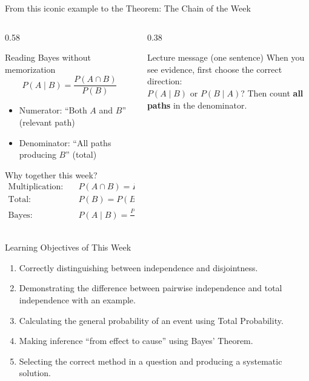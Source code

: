 \documentclass[light]{lutbeamer}
\begin{document}
\begin{frame}{From this iconic example to the Theorem: The Chain of the Week}
    \footnotesize
    \begin{columns}[T]
        \begin{column}{0.58\textwidth}
            \begin{block}{Reading Bayes without memorization}
                \[
                P(A\mid B)=\frac{P(A\cap B)}{P(B)}
                \]
                \begin{itemize}
                    \item Numerator: ``Both $A$ and $B$'' (relevant path)
                    \item Denominator: ``All paths producing $B$'' (total)
                \end{itemize}
            \end{block}

            \begin{block}{Why together this week?}
                \[
                \begin{aligned}
                    \text{Multiplication:}\quad & P(A\cap B)=P(A)P(B\mid A) \\
                    \text{Total:}\quad & P(B)=P(B\mid A)P(A)+P(B\mid A')P(A') \\
                    \text{Bayes:}\quad & P(A\mid B)=\frac{P(A\cap B)}{P(B)}
                \end{aligned}
                \]
            \end{block}
        \end{column}

        \begin{column}{0.38\textwidth}
            \begin{alertblock}{Lecture message (one sentence)}
                When you see evidence, first choose the correct direction: \\
                \(P(A\mid B)\) or \(P(B\mid A)\)?
                Then count \textbf{all paths} in the denominator.
            \end{alertblock}

        \end{column}
    \end{columns}
\end{frame}

\begin{frame}{Learning Objectives of This Week}
    \begin{enumerate}
        \item Correctly distinguishing between independence and disjointness.
        \item Demonstrating the difference between pairwise independence and total independence with an example.
        \item Calculating the general probability of an event using Total Probability.
        \item Making inference ``from effect to cause'' using Bayes' Theorem.
        \item Selecting the correct method in a question and producing a systematic solution.
    \end{enumerate}
\end{frame}
\end{document}
